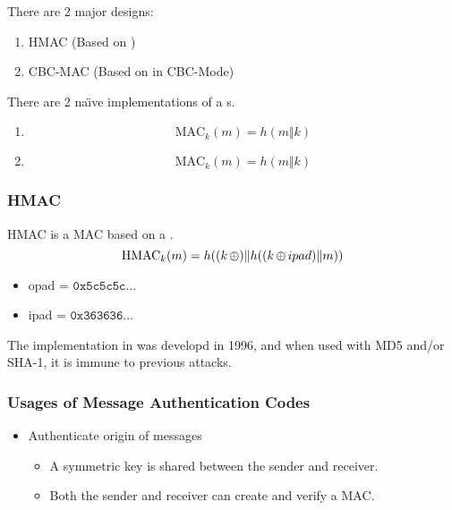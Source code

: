 There are 2 major designs:
\begin{enumerate}[noitemsep]
\item HMAC (Based on )
\item CBC-MAC (Based on  in CBC-Mode)
\end{enumerate}

There are 2 na\"{\i}ve implementations of a s.
\begin{enumerate}[noitemsep]
\item
  \begin{equation*}
    \text{MAC}_{k}(m) = h(m \Vert k)
  \end{equation*}
\item
  \begin{equation*}
    \text{MAC}_{k}(m) = h(m \Vert k)
  \end{equation*}
\end{enumerate}

\subsubsection{HMAC}\label{subsubsec:HMAC}
HMAC is a MAC based on a .
\begin{equation}\label{eq:HMAC}
  \text{HMAC}_{k}(m) = h((k \operatorname{\oplus}) \Vert h((k \operatorname{\oplus} ipad) \Vert m))
\end{equation}
\begin{itemize}[noitemsep]
\item opad = $\mathtt{0x5c5c5c} \ldots$
\item ipad = $\mathtt{0x363636} \ldots$
\end{itemize}

The implementation in  was developd in 1996, and when used with MD5 and/or SHA-1, it is immune to previous attacks.

\subsubsection{Usages of Message Authentication Codes}\label{subsubsec:MAC_Usages}
\begin{itemize}[noitemsep]
\item Authenticate origin of messages
  \begin{itemize}[noitemsep]
  \item A symmetric key is shared between the sender and receiver.
  \item Both the sender and receiver can create and verify a MAC.
  \end{itemize}
\end{itemize}

